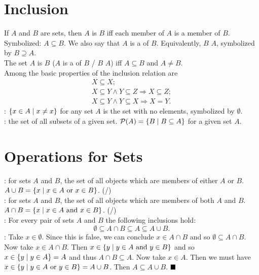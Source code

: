 \documentclass[12pt]{book}
\begin{document}
\section{Inclusion}
If $A$ and $B$ are sets, then $A$ is  $B$ iff each member of $A$ is a member of $B$. Symbolized: $A \subseteq B$. We also say that $A$ is a  of $B$. Equivalently, $B$  $A$, symbolized by $B \supseteq A$.\\ The set $A$ is  $B$ ($A$ is a  of $B$ / $B$  $A$) iff $A \subseteq B$ and $A \neq B$.\\ Among the basic properties of the inclusion relation are
\begin{gather*}
X \subseteq X;\\ X \subseteq Y \wedge Y \subseteq Z \Rightarrow X \subseteq Z;\\ X \subseteq Y \wedge Y \subseteq X \Rightarrow X = Y.
\end{gather*}
: $\set{x \in A \mid x \neq x}$ for any set $A$ is the set with no elements, symbolized by $\emptyset$.\\
: the set of all subsets of a given set. $\mathcal{P}(A) = \set{B \mid B \subseteq A}$ for a given set $A$.

\section{Operations for Sets}
: for sets $A$ and $B$, the set of all objects which are members of either $A$ or $B$. $A \cup B = \set{x \mid x \in A \text{ or } x \in B}$. (/)\\
: for sets $A$ and $B$, the set of all objects which are members of both $A$ and $B$. $A \cap B = \set{x \mid x \in A \text{ and } x \in B}$. (/)\\

: For every pair of sets $A$ and $B$ the following inclusions hold: $$\emptyset \subseteq A \cap B \subseteq A \subseteq A \cup B.$$
: Take $x \in \emptyset$. Since this is false, we can conclude $x \in A \cap B$ and so $\emptyset \subseteq A \cap B$. Now take $x \in A \cap B$. Then $x \in \set{y \mid y \in A \text{ and } y \in B}$ and so $x \in \set{y \mid y \in A} = A$ and thus $A \cap B \subseteq A$. Now take $x \in A$. Then we must have $x \in \set{y \mid y \in A \text{ or } y \in B} = A \cup B$. Then $A \subseteq A \cup B$. $\qed$\\
\end{document}
